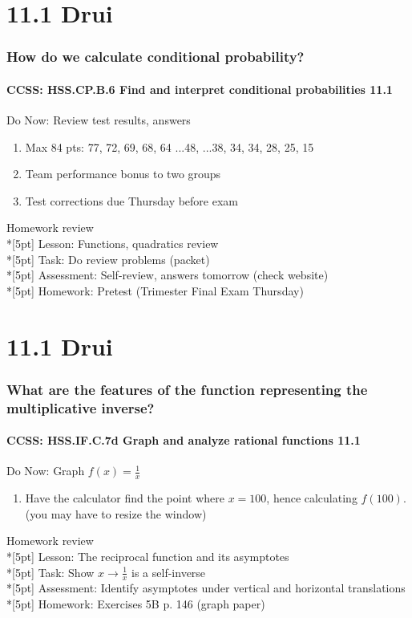\documentclass{beamer}
\begin{document}
  \section{11.1 Drui}
  \frame
  {
    \frametitle{How do we calculate conditional probability?}
    \framesubtitle{CCSS: HSS.CP.B.6 Find and interpret conditional probabilities \qquad \alert{11.1}}

    \begin{block}{Do Now: Review test results, answers}
    \begin{enumerate}
        \item Max 84 pts: 77, 72, 69, 68, 64 ...48, ...38, 34, 34, 28, 25, 15 \item Team performance bonus to two groups
        \item Test corrections due Thursday before exam
    \end{enumerate}
    \end{block}
    Homework review\\*[5pt]
    Lesson: Functions, quadratics review\\*[5pt]
    Task: Do review problems (packet)\\*[5pt]
    Assessment: Self-review, answers tomorrow (check website)\\*[5pt]
    Homework: Pretest (\alert{Trimester Final Exam Thursday})
  }

  \section{11.1 Drui}
  \frame
  {
    \frametitle{What are the features of the function representing the multiplicative inverse?}
    \framesubtitle{CCSS: HSS.IF.C.7d Graph and analyze rational functions \qquad \alert{11.1}}

    \begin{block}{Do Now: Graph $f(x)=\frac{1}{x}$}
    \begin{enumerate}
        \item Have the calculator find the point where $x=100$, hence calculating $f(100)$. (you may have to resize the window)
    \end{enumerate}
    \end{block}
    Homework review\\*[5pt]
    Lesson: The reciprocal function and its asymptotes\\*[5pt]
    Task: Show $x \xrightarrow{} \frac{1}{x}$ is a self-inverse\\*[5pt]
    Assessment: Identify asymptotes under vertical and horizontal translations\\*[5pt]
    Homework: Exercises 5B p. 146 (graph paper)
  }
\end{document}
